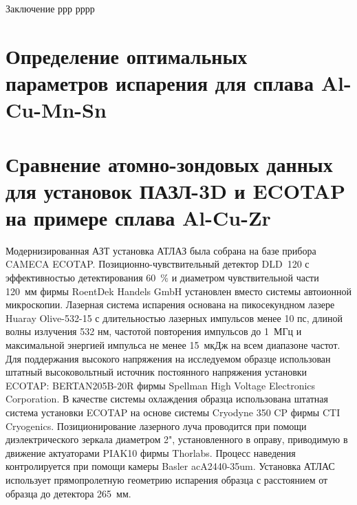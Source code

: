 \FloatBarrier
Заключение ррр рррр

\section{Определение оптимальных параметров испарения для сплава Al-Cu-Mn-Sn}\label{sec:ch3/sect3}



\FloatBarrier

\section{Сравнение атомно-зондовых данных для установок ПАЗЛ-3D и ECOTAP на примере сплава Al-Cu-Zr}\label{sec:ch3/sect4}

Модернизированная АЗТ установка АТЛАЗ была собрана на базе прибора CAMECA ECOTAP. Позиционно-чувствительный детектор DLD~120 с эффективностью детектирования 60~$\%$ и диаметром чувствительной части 120~мм фирмы RoentDek Handels GmbH установлен вместо системы автоионной микроскопии. Лазерная система испарения основана на пикосекундном лазере Huaray Olive-532-15 с длительностью лазерных импульсов менее 10 пс, длиной волны излучения 532 нм, частотой повторения импульсов до 1~МГц и максимальной энергией импульса не менее 15~мкДж на всем диапазоне частот. Для поддержания высокого напряжения на исследуемом образце использован штатный высоковольтный источник постоянного напряжения установки ECOTAP: BERTAN205B-20R фирмы Spellman High Voltage Electronics Corporation. В качестве системы охлаждения образца использована штатная система установки ECOTAP на основе системы Cryodyne 350 CP фирмы CTI Cryogenics. Позиционирование лазерного луча проводится при помощи диэлектрического зеркала диаметром 2", установленного в оправу, приводимую в движение актуаторами PIAK10 фирмы Thorlabs. Процесс наведения контролируется при помощи камеры Basler acA2440-35um. Установка АТЛАС использует прямопролетную геометрию испарения образца с расстоянием от образца до детектора 265~мм.

